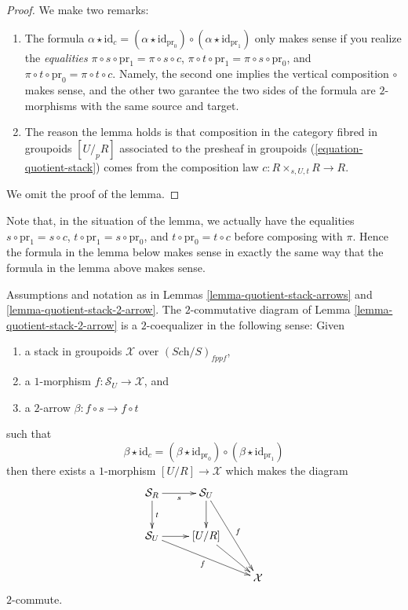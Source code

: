 \begin{proof}
We make two remarks:
\begin{enumerate}
\item The formula
$\alpha \star \text{id}_c = (\alpha \star \text{id}_{\text{pr}_0}) \circ
(\alpha \star \text{id}_{\text{pr}_1})$ only makes sense if you realize
the {\it equalities} $\pi \circ s \circ \text{pr}_1 = \pi \circ s \circ c$,
$\pi \circ t \circ \text{pr}_1 = \pi \circ s \circ \text{pr}_0$, and
$\pi \circ t \circ \text{pr}_0 = \pi \circ t \circ c$. Namely, the second
one implies the vertical composition $\circ$ makes sense, and the other
two garantee the two sides of the formula are $2$-morphisms with the
same source and target.
\item The reason the lemma holds is that composition in the
category fibred in groupoids $[U/_{\!p}R]$ associated to the presheaf
in groupoids (\ref{equation-quotient-stack}) comes from the composition
law $c : R \times_{s, U, t} R \to R$.
\end{enumerate}
We omit the proof of the lemma.
\end{proof}

\noindent
Note that, in the situation of the lemma, we actually have the equalities
$s \circ \text{pr}_1 = s \circ c$,
$t \circ \text{pr}_1 = s \circ \text{pr}_0$, and
$t \circ \text{pr}_0 = t \circ c$ before composing with $\pi$.
Hence the formula in the lemma below makes sense in exactly the same way
that the formula in the lemma above makes sense.

\begin{lemma}
\label{lemma-quotient-stack-2-coequalizer}
Assumptions and notation as in
Lemmas \ref{lemma-quotient-stack-arrows} and
\ref{lemma-quotient-stack-2-arrow}.
The $2$-commutative diagram of Lemma \ref{lemma-quotient-stack-2-arrow}
is a $2$-coequalizer in the following sense:
Given
\begin{enumerate}
\item a stack in groupoids $\mathcal{X}$ over $(\textit{Sch}/S)_{fppf}$,
\item a $1$-morphism $f : \mathcal{S}_U \to \mathcal{X}$, and
\item a $2$-arrow $\beta : f \circ s \to f \circ t$
\end{enumerate}
such that
$$
\beta \star \text{id}_c
=
(\beta \star \text{id}_{\text{pr}_0})
\circ
(\beta \star \text{id}_{\text{pr}_1})
$$
then there exists a $1$-morphism $[U/R] \to \mathcal{X}$ which makes the
diagram
$$
\xymatrix{
\mathcal{S}_R \ar[r]_s \ar[d]^t & \mathcal{S}_U \ar[d] \ar[ddr]^f \\
\mathcal{S}_U \ar[r] \ar[rrd]_f & [U/R] \ar[rd] \\
& & \mathcal{X}
}
$$
$2$-commute.
\end{lemma}

